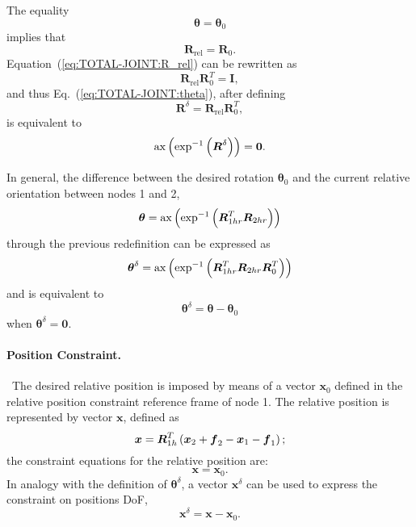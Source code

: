 \documentclass[10pt,dvips,fleqn,subeqn]{report}
\newcommand{\T}[1]{\boldsymbol{#1}}
\begin{document}
The equality
\begin{equation}
	\T{\theta} = \T{\theta}_0
	\label{eq:TOTAL-JOINT:theta}
\end{equation}
implies that
\begin{equation}
	\T{R}_{\mathrm{rel}} = \T{R}_0 .
	\label{eq:TOTAL-JOINT:R_rel}
\end{equation}
Equation~(\ref{eq:TOTAL-JOINT:R_rel}) can be rewritten as
\begin{equation}
	\T{R}_{\mathrm{rel}} \T{R}_0^T = \T{I} ,
\end{equation}
and thus Eq.~(\ref{eq:TOTAL-JOINT:theta}),
after defining
\begin{equation}
	\T{R}^{\delta} = \T{R}_{\text{rel}} \T{R}_0^T ,
	\label{eq:TOTAL-JOINT:R^delta}
\end{equation}
is equivalent to
\begin{equation}
	\llk{ax}\plbr{\exp^{-1}\plbr{\T{R}^{\delta}}} = \T{0} .
\end{equation}

\noindent
In general, the difference between the desired rotation
$\T{\theta}_0$ and the current relative orientation between
nodes 1 and 2,
\begin{equation}
	\T{\theta} = \llk{ax}\plbr{\exp^{-1}\plbr{
		\T{R}_{1hr}^T \T{R}_{2hr}
	}}
\end{equation}
through the previous redefinition can be expressed as
\begin{equation}
	\T{\theta}^{\delta} = \llk{ax}\plbr{\exp^{-1}\plbr{
		\T{R}_{1hr}^T \T{R}_{2hr} \T{R}_0^T
	}}
	\label{eq:TOTAL-JOINT:thetadelta}
\end{equation}
and is equivalent to
\begin{equation}
	\T{\theta}^{\delta} = \T{\theta} - \T{\theta}_0
\end{equation}
when $\T{\theta}^{\delta}=\T{0}$.

\paragraph{Position Constraint.} \
The desired relative position is imposed by means of a vector $\T{x}_0$
defined in the relative position constraint reference frame of node 1.
The relative position is represented by vector $\T{x}$, defined as
\begin{equation}
	\T{x} = \T{R}_{1h}^T\plbr{
		\T{x}_2 + \T{f}_2 - \T{x}_1 - \T{f}_1
	} ;
\end{equation}
the constraint equations for the relative position are:
\begin{equation}
	\T{x} = \T{x}_0 .
\end{equation}
In analogy with the definition of $\T{\theta}^{\delta}$, a vector
$\T{x}^{\delta}$ can be used to express the constraint on positions DoF,
\begin{equation}
	\T{x}^{\delta} = \T{x} - \T{x}_0 .
\end{equation}
\end{document}

